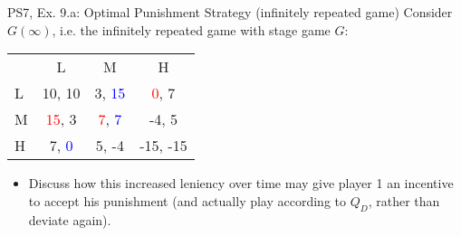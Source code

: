 \begin{frame}{PS7, Ex. 9.a: Optimal Punishment Strategy (infinitely repeated game)}
    Consider $G(\infty)$, i.e. the infinitely repeated game with stage game $G$: \vspace{-6pt}
    \begin{table}
      \begin{tabular}{l|c|c|c|}
        \multicolumn{1}{c}{} & \multicolumn{1}{c}{L} & \multicolumn{1}{c}{M} & \multicolumn{1}{c}{H} \\\cline{2-4}
        L & 10, 10 & 3, \textcolor{blue}{15} & \textcolor{red}{0}, 7 \\\cline{2-4}
        M & \textcolor{red}{15}, 3 & \textcolor{red}{7}, \textcolor{blue}{7} & -4, 5 \\\cline{2-4}
        H & 7, \textcolor{blue}{0} & 5, -4 & -15, -15 \\\cline{2-4}
      \end{tabular}
    \end{table}
    \vspace{-4pt}
    \begin{itemize}
      \item[(a)] Discuss how this increased leniency over time may give player 1 an incentive to accept his punishment (and actually play according to $Q_D$, rather than deviate again).
    \end{itemize}
    \vfill\null
\end{frame}
